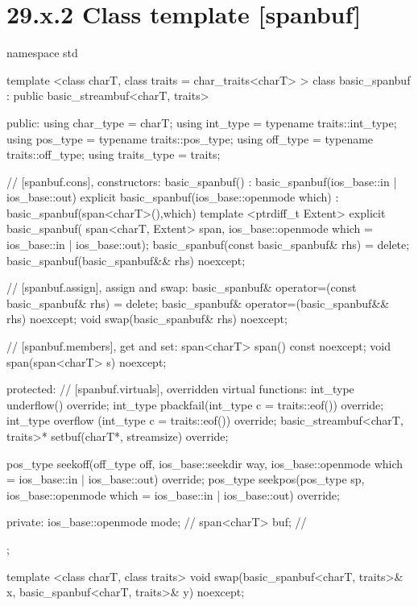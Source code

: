 \documentclass[ebook,11pt,article]{memoir}
\renewcommand{\iref}[1]{[#1]}
\begin{document}
\section{29.x.2 Class template  [spanbuf]}
\begin{codeblock}
namespace std {
  template <class charT, class traits = char_traits<charT> >
  class basic_spanbuf
    : public basic_streambuf<charT, traits> {
  public:
    using char_type      = charT;
    using int_type       = typename traits::int_type;
    using pos_type       = typename traits::pos_type;
    using off_type       = typename traits::off_type;
    using traits_type    = traits;

    // \iref{spanbuf.cons}, constructors:
    basic_spanbuf() : basic_spanbuf(ios_base::in | ios_base::out) {}
    explicit basic_spanbuf(ios_base::openmode which)
      : basic_spanbuf(span<charT>(),which) {}
    template <ptrdiff_t Extent>
    explicit basic_spanbuf(
      span<charT, Extent> span,
      ios_base::openmode which = ios_base::in | ios_base::out);
    basic_spanbuf(const basic_spanbuf& rhs) = delete;
    basic_spanbuf(basic_spanbuf&& rhs) noexcept;

    // \iref{spanbuf.assign}, assign and swap:
    basic_spanbuf& operator=(const basic_spanbuf& rhs) = delete;
    basic_spanbuf& operator=(basic_spanbuf&& rhs) noexcept;
    void swap(basic_spanbuf& rhs) noexcept;

    // \iref{spanbuf.members}, get and set:
    span<charT> span() const noexcept;
    void span(span<charT> s) noexcept;

  protected:
    // \iref{spanbuf.virtuals}, overridden virtual functions:
    int_type underflow() override;
    int_type pbackfail(int_type c = traits::eof()) override;
    int_type overflow (int_type c = traits::eof()) override;
    basic_streambuf<charT, traits>* setbuf(charT*, streamsize) override;

    pos_type seekoff(off_type off, ios_base::seekdir way,
                     ios_base::openmode which
                      = ios_base::in | ios_base::out) override;
    pos_type seekpos(pos_type sp,
                     ios_base::openmode which
                      = ios_base::in | ios_base::out) override;

  private:
    ios_base::openmode mode;  // \expos
    span<charT> buf; // \expos
  };

  template <class charT, class traits>
    void swap(basic_spanbuf<charT, traits>& x,
              basic_spanbuf<charT, traits>& y) noexcept;
}
\end{codeblock}
\end{document}
